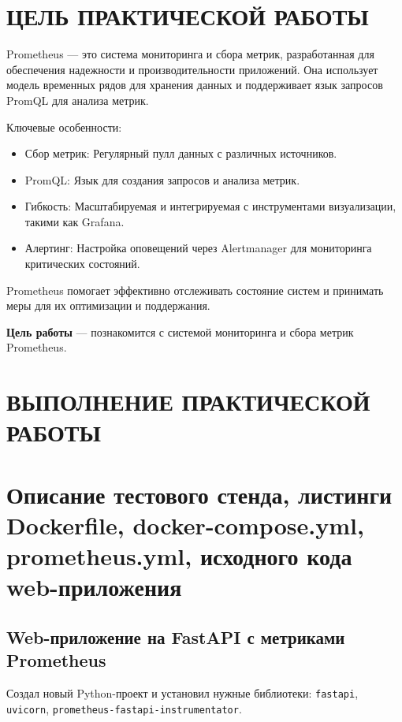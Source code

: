 \section*{ЦЕЛЬ ПРАКТИЧЕСКОЙ РАБОТЫ}

Prometheus --- это система мониторинга и сбора метрик,
разработанная для обеспечения надежности и производительности приложений.
Она использует модель временных рядов для хранения данных
и поддерживает язык запросов PromQL для анализа метрик.

Ключевые особенности:

\begin{itemize}
	\item Сбор метрик: Регулярный пулл данных с различных источников.
	\item PromQL: Язык для создания запросов и анализа метрик.
	\item Гибкость: Масштабируемая и интегрируемая
		с инструментами визуализации, такими как Grafana.
	\item Алертинг: Настройка оповещений через Alertmanager
		для мониторинга критических состояний.
\end{itemize}

Prometheus помогает эффективно отслеживать состояние систем
и принимать меры для их оптимизации и поддержания.

\textbf{Цель работы} --- познакомится с системой мониторинга
и сбора метрик Prometheus.

\clearpage

\section*{ВЫПОЛНЕНИЕ ПРАКТИЧЕСКОЙ РАБОТЫ}

\section{Описание тестового стенда,
	листинги Dockerfile, docker-compose.yml, prometheus.yml,
	исходного кода web-приложения}

\subsection{Web-приложение на FastAPI с метриками Prometheus}

Создал новый Python-проект и установил нужные библиотеки:
\texttt{fastapi}, \texttt{uvicorn}, \texttt{prometheus-fastapi-instrumentator}.


